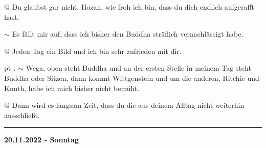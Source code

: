 \documentclass[10pt,a4paper]{article}
\newcounter{notec}
\newcommand\notep[1]{%
  \stepcounter{notec}
  \vskip #1pt
  {\bf\arabic{notec}.}
}
\newcommand\rele[1] {{\color {english} \bf {#1}}}              %
\newcommand\ddivide {\vskip -9pt \hrule \vskip 6pt}
\begin{document}
\begin{mdframed}[style=daystyle]
  \vskip 2pt
  @ Du glaubst gar nicht, Hozan, wie froh ich bin, dass du dich endlich
  aufgerafft hast.

  \vskip 2pt
  $\sim$ Es fällt mir auf, dass ich bisher den Buddha sträflich vernachlässigt habe.

  \vskip 2pt
  @ Jeden Tag ein Bild und ich bin sehr zufrieden mit dir.


  \notep 4 $\sim$ Wega, oben steht Buddha und an der ersten Stelle in meinem Tag
  steht Buddha oder Sitzen, dann kommt Wittgenstein und um die anderen, Ritchie
  und Knuth, habe ich mich bisher nicht bemüht.

  \vskip 2pt
  @ Dann wird es langsam Zeit, dass du die aus deinem Alltag nicht weiterhin ausschließt.
  
\end{mdframed}


\ddivide
{\rele {20.11.2022 - Sonntag}}
\end{document}
